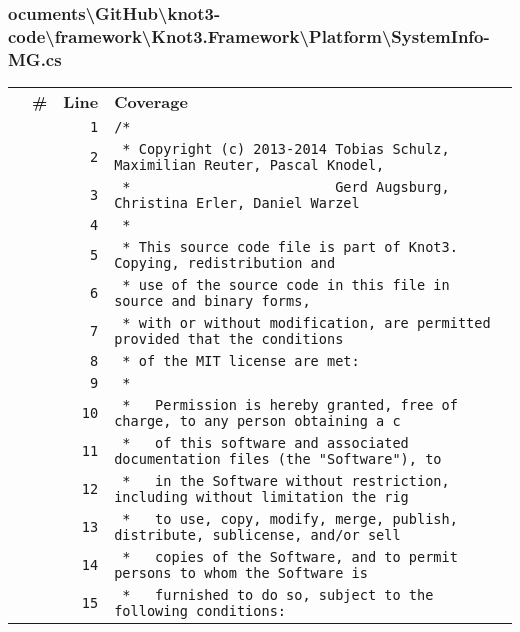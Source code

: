 \documentclass[a4paper,10pt]{article}
\begin{document}
\subsubsection{ocuments\textbackslash GitHub\textbackslash knot3-code\textbackslash framework\textbackslash Knot3.Framework\textbackslash Platform\textbackslash SystemInfo-MG.cs}
\begin{longtable}[l]{lrrl}
\textbf{} & \textbf{\#} & \textbf{Line} & \textbf{Coverage}\\
\cellcolor{gray} &  & \verb~1~ & \verb~/*~\\
\cellcolor{gray} &  & \verb~2~ & \verb~ * Copyright (c) 2013-2014 Tobias Schulz, Maximilian Reuter, Pascal Knodel,~\\
\cellcolor{gray} &  & \verb~3~ & \verb~ *                         Gerd Augsburg, Christina Erler, Daniel Warzel~\\
\cellcolor{gray} &  & \verb~4~ & \verb~ *~\\
\cellcolor{gray} &  & \verb~5~ & \verb~ * This source code file is part of Knot3. Copying, redistribution and~\\
\cellcolor{gray} &  & \verb~6~ & \verb~ * use of the source code in this file in source and binary forms,~\\
\cellcolor{gray} &  & \verb~7~ & \verb~ * with or without modification, are permitted provided that the conditions~\\
\cellcolor{gray} &  & \verb~8~ & \verb~ * of the MIT license are met:~\\
\cellcolor{gray} &  & \verb~9~ & \verb~ *~\\
\cellcolor{gray} &  & \verb~10~ & \verb~ *   Permission is hereby granted, free of charge, to any person obtaining a c~\\
\cellcolor{gray} &  & \verb~11~ & \verb~ *   of this software and associated documentation files (the "Software"), to ~\\
\cellcolor{gray} &  & \verb~12~ & \verb~ *   in the Software without restriction, including without limitation the rig~\\
\cellcolor{gray} &  & \verb~13~ & \verb~ *   to use, copy, modify, merge, publish, distribute, sublicense, and/or sell~\\
\cellcolor{gray} &  & \verb~14~ & \verb~ *   copies of the Software, and to permit persons to whom the Software is~\\
\cellcolor{gray} &  & \verb~15~ & \verb~ *   furnished to do so, subject to the following conditions:~\\

\end{longtable}
\end{document}
